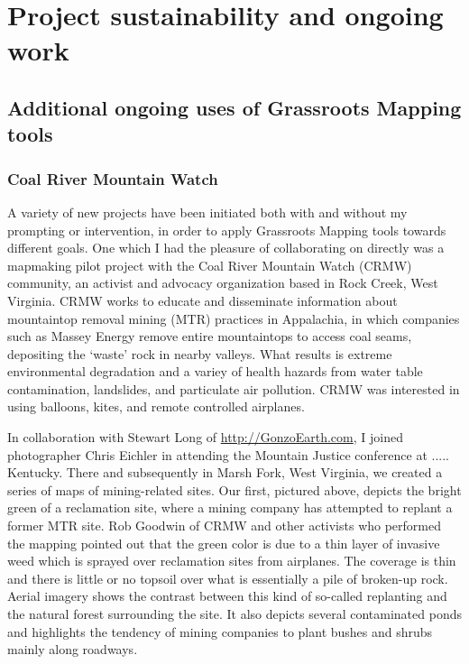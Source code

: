 \documentclass[11pt]{report}
\begin{document}

\chapter{Project sustainability and ongoing work}

\section{Additional ongoing uses of Grassroots Mapping tools}

\subsection{Coal River Mountain Watch}

A variety of new projects have been initiated both with and without my prompting or intervention, in order to apply Grassroots Mapping tools towards different goals. One which I had the pleasure of collaborating on directly was a mapmaking pilot project with the Coal River Mountain Watch (CRMW) community, an activist and advocacy organization based in Rock Creek, West Virginia. CRMW works to educate and disseminate information about mountaintop removal mining (MTR) practices in Appalachia, in which companies such as Massey Energy remove entire mountaintops to access coal seams, depositing the `waste' rock in nearby valleys. What results is extreme environmental degradation and a variey of health hazards from water table contamination, landslides, and particulate air pollution. CRMW was interested in using balloons, kites, and remote controlled airplanes. 


In collaboration with Stewart Long of \url{http://GonzoEarth.com}, I joined photographer Chris Eichler in attending the Mountain Justice conference at ..... Kentucky. There and subsequently in Marsh Fork, West Virginia, we created a series of maps of mining-related sites. Our first, pictured above, depicts the bright green of a reclamation site, where a mining company has attempted to replant a former MTR site. Rob Goodwin of CRMW and other activists who performed the mapping pointed out that the green color is due to a thin layer of invasive weed which is sprayed over reclamation sites from airplanes. The coverage is thin and there is little or no topsoil over what is essentially a pile of broken-up rock. Aerial imagery shows the contrast between this kind of so-called replanting and the natural forest surrounding the site. It also depicts several contaminated ponds and highlights the tendency of mining companies to plant bushes and shrubs mainly along roadways. 
\end{document}
